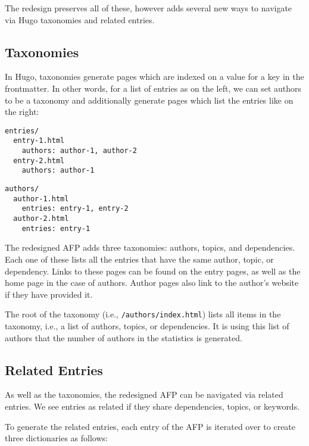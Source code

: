 \documentclass[bsc,frontabs,oneside,singlespacing,parskip,deptreport,logo]{infthesis}
\begin{document}
The redesign preserves all of these, however adds several new ways to navigate via Hugo taxonomies and related entries.

\subsection{Taxonomies}

In Hugo, taxonomies generate pages which are indexed on a value for a key in the frontmatter. In other words, for a list of entries as on the left, we can set authors to be a taxonomy and additionally generate pages which list the entries like on the right:

\begin{minipage}[t]{0.47\textwidth}
{\footnotesize
\begin{verbatim}
entries/
  entry-1.html
    authors: author-1, author-2
  entry-2.html
    authors: author-1
\end{verbatim}
}
\end{minipage}\hfill
\begin{minipage}[t]{0.47\textwidth}
{\footnotesize
\begin{verbatim}
authors/
  author-1.html
    entries: entry-1, entry-2
  author-2.html
    entries: entry-1
\end{verbatim}
}
\end{minipage}

The redesigned AFP adds three taxonomies: authors, topics, and dependencies. Each one of these lists all the entries that have the same author, topic, or dependency. Links to these pages can be found on the entry pages, as well as the home page in the case of authors. Author pages also link to the author's website if they have provided it.

The root of the taxonomy (i.e., \texttt{/authors/index.html}) lists all items in the taxonomy, i.e., a list of authors, topics, or dependencies. It is using this list of authors that the number of authors in the statistics is generated.

\subsection{Related Entries} \label{sec:related-entries}

As well as the taxonomies, the redesigned AFP can be navigated via related entries. We see entries as related if they share dependencies, topics, or keywords.

To generate the related entries, each entry of the AFP is iterated over to create three dictionaries as follows: 
\end{document}

